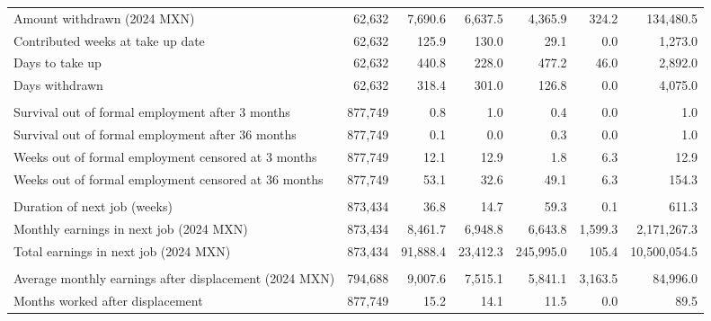 \documentclass[
  4pt,
]{report}
\begin{document}
\begin{table}
{{\begin{threeparttable}
\begin{tabular}[t]{lrrrrrr}
\hspace{1em}Amount withdrawn (2024 MXN) & 62,632 & 7,690.6 & 6,637.5 & 4,365.9 & 324.2 & 134,480.5\\
\hspace{1em}Contributed weeks at take up date & 62,632 & 125.9 & 130.0 & 29.1 & 0.0 & 1,273.0\\
\hspace{1em}Days to take up & 62,632 & 440.8 & 228.0 & 477.2 & 46.0 & 2,892.0\\
\hspace{1em}Days withdrawn & 62,632 & 318.4 & 301.0 & 126.8 & 0.0 & 4,075.0\\
\addlinespace[0.3em]
\multicolumn{7}{l}{\textbf{Job Search Outcomes}}\\
\hspace{1em}Survival out of formal employment after 3 months & 877,749 & 0.8 & 1.0 & 0.4 & 0.0 & 1.0\\
\hspace{1em}Survival out of formal employment after 36 months & 877,749 & 0.1 & 0.0 & 0.3 & 0.0 & 1.0\\
\hspace{1em}Weeks out of formal employment censored at 3 months & 877,749 & 12.1 & 12.9 & 1.8 & 6.3 & 12.9\\
\hspace{1em}Weeks out of formal employment censored at 36 months & 877,749 & 53.1 & 32.6 & 49.1 & 6.3 & 154.3\\
\addlinespace[0.3em]
\multicolumn{7}{l}{\textbf{Next Job Quality}}\\
\hspace{1em}Duration of next job (weeks) & 873,434 & 36.8 & 14.7 & 59.3 & 0.1 & 611.3\\
\hspace{1em}Monthly earnings in next job (2024 MXN) & 873,434 & 8,461.7 & 6,948.8 & 6,643.8 & 1,599.3 & 2,171,267.3\\
\hspace{1em}Total earnings in next job (2024 MXN) & 873,434 & 91,888.4 & 23,412.3 & 245,995.0 & 105.4 & 10,500,054.5\\
\addlinespace[0.3em]
\multicolumn{7}{l}{\textbf{Medium Term Outcomes (Over 3 Years)}}\\
\hspace{1em}Average monthly earnings after displacement (2024 MXN) & 794,688 & 9,007.6 & 7,515.1 & 5,841.1 & 3,163.5 & 84,996.0\\
\hspace{1em}Months worked after displacement & 877,749 & 15.2 & 14.1 & 11.5 & 0.0 & 89.5\\

\end{tabular}
\end{threeparttable}}}
\end{table}
\end{document}
